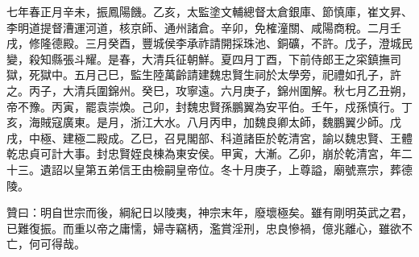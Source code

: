 七年春正月辛未，振鳳陽饑。乙亥，太監塗文輔總督太倉銀庫、節慎庫，崔文昇、李明道提督漕運河道，核京師、通州諸倉。辛卯，免榷潼關、咸陽商稅。二月壬戌，修隆德殿。三月癸酉，豐城侯李承祚請開採珠池、銅礦，不許。戊子，澄城民變，殺知縣張斗耀。是春，大清兵征朝鮮。夏四月丁酉，下前侍郎王之寀鎮撫司獄，死獄中。五月己巳，監生陸萬齡請建魏忠賢生祠於太學旁，祀禮如孔子，許之。丙子，大清兵圍錦州。癸巳，攻寧遠。六月庚子，錦州圍解。秋七月乙丑朔，帝不豫。丙寅，罷袁崇煥。己卯，封魏忠賢孫鵬翼為安平伯。壬午，戍孫慎行。丁亥，海賊寇廣東。是月，浙江大水。八月丙申，加魏良卿太師，魏鵬翼少師。戊戌，中極、建極二殿成。乙巳，召見閣部、科道諸臣於乾清宮，諭以魏忠賢、王體乾忠貞可計大事。封忠賢姪良棟為東安侯。甲寅，大漸。乙卯，崩於乾清宮，年二十三。遺詔以皇第五弟信王由檢嗣皇帝位。冬十月庚子，上尊謚，廟號熹宗，葬德陵。

贊曰：明自世宗而後，綱紀日以陵夷，神宗末年，廢壞極矣。雖有剛明英武之君，已難復振。而重以帝之庸懦，婦寺竊柄，濫賞淫刑，忠良慘禍，億兆離心，雖欲不亡，何可得哉。

